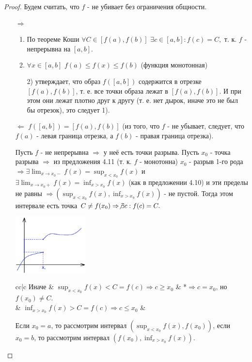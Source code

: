 	\begin{proof}
	    Будем считать, что $f$ - не убивает без ограничения общности.
	    \begin{itemize}
	    	\item[$\Rightarrow$]
		    \begin{enumerate}
		    	\item По теореме Коши $\forall C \in [f(a), f(b)]$ $\exists c \in [a, b]: f(c) = C,$ т. к. $f$ - непрерывна на $[a, b]$.
		    	\item $\forall x \in [a, b]$ $f(a) \leqslant f(x) \leqslant f(b)$ (функция монотонная)
		    	
		    	2) утверждает, что образ $f([a, b])$ содержится в отрезке $[f(a), f(b)]$, т. е. все точки образа лежат в $[f(a), f(b)]$. И при этом они лежат плотно друг к другу (т. е. нет дырок, иначе это не был бы отрезок), это следует 1).
		    \end{enumerate}
		    \item[$\Leftarrow$] $f([a, b]) = [f(a), f(b)]$ (из того, что $f$ - не убывает, следует, что $f(a)$ - левая граница отрезка, а $f(b)$ - правая граница отрезка).
		    
		    Пусть $f$ - не непрерывна $\Rightarrow$ у неё есть точки разрыва. Пусть $x_0$ - точка разрыва $\Rightarrow$ из предложения 4.11 (т. к. $f$ - монотонна) $x_0$ - разрыв 1-го рода $\Rightarrow \exists \lim_{x \to x_0-} f(x) = \sup_{x < x_0} f(x)$ и $\exists \lim_{x \to x_0+} f(x) = \inf_{x > x_0} f(x)$ (как в предложении 4.10) и эти пределы не равны $\Rightarrow (\sup_{x < x_0} f(x), \inf_{x > x_9} f(x))$ - не пустой. Тогда этом интервале есть точка $C \neq f(x_0) \Rightarrow \not\exists c: f(c) = C.$
		    
		    \begin{center}
		    	\includegraphics[width=0.3\textwidth]{img/lecture14/graph_of_monotonic _function}
		    \end{center}
		    
		    \begin{tabular}{cc|c}
		    	Иначе & $\sup_{x < x_0} f(x) < C = f(c) \Rightarrow c \geqslant x_0$ & *{$\Rightarrow c = x_0$, но $f(x_0) \neq C$.} \\
		    	& $\inf_{x > x_0} f(x) > C = f(c) \Rightarrow c \leqslant x_0$ &
		    \end{tabular}
		    
		    Если $x_0 = a$, то рассмотрим интервал $(\sup_{x < x_0} f(x), f(x_0))$, если $x_0 = b$, то рассмотрим интервал $(f(x_0), \inf_{x > x_0} f(x))$.
		\end{itemize}
	\end{proof}
	
